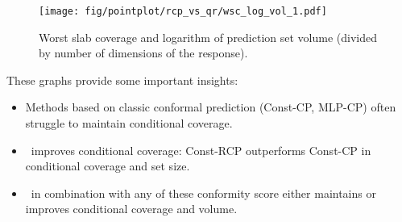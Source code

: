   \begin{figure}[H]
    \centering
    \texttt{[image: fig/pointplot/rcp\_vs\_qr/wsc\_log\_vol\_1.pdf]}
    \caption{Worst slab coverage and logarithm of prediction set volume (divided by number of dimensions of the response).}
    \label{fig:pointplot/rcp_vs_qr/horizontal}
  \end{figure}

  These graphs provide some important insights:
  \begin{itemize}
    \item Methods based on classic conformal prediction (Const-CP, MLP-CP) often struggle to maintain conditional coverage.
    \item \RCP\ improves conditional coverage: Const-RCP outperforms Const-CP in conditional coverage and set size.
    \item \RCP\ in combination with any of these conformity score either maintains or improves conditional coverage and volume.
  \end{itemize}
